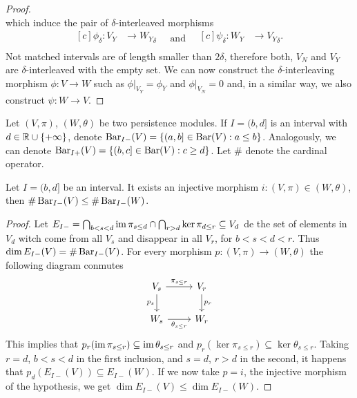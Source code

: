 \begin{proof}
\begin{equation*}
    \end{equation*}
    which induce the pair of $\delta$-interleaved morphisms
    \begin{equation*}
        \begin{aligned}[c]
        \phi_\delta: V_Y &\to {W_Y}_\delta\\
        \end{aligned}
        \quad \text{and} \quad
        \begin{aligned}[c]
        \psi_\delta: W_Y &\to {V_Y}_\delta.\\
        \end{aligned}
    \end{equation*}
    Not matched intervals are of length smaller than $ 2 \delta $, therefore both, $V_N$ and $V_Y$ are $\delta$-interleaved with the empty set. We can now construct the $\delta$-interleaving morphism $ \phi: V \to W$ such as $\phi \vert_{V_Y} = \phi_Y$ and $\phi \vert_{V_N} = 0$ and, in a similar way, we also construct $ \psi: W \to V$.
\end{proof}

Let $(V, \pi)$, $(W, \theta)$ be two persistence modules. If $ I = (b, d]$ is an interval with $ d \in \mathbb R \cup \{+ \infty\}$, denote $ \operatorname{Bar}_{I-}(V) = \left\{ (a, b] \in \operatorname{Bar}(V) : a \leq b\right\}$. Analogously, we can denote $ \operatorname{Bar}_{I+}(V) = \left\{ (b, c] \in \operatorname{Bar}(V) : c \geq d\right\}$. Let $ \# $ denote the cardinal operator.

\begin{lemma} %
    Let $ I = (b, d] $ be an interval. It exists an injective morphism $i: (V, \pi) \in (W, \theta) $, then $\# \operatorname{Bar}_{I-}(V) \leq \# \operatorname{Bar}_{I-}(W) $.
\end{lemma}
\begin{proof}
    Let $ E_{I-} = \bigcap_{b < s < d} \operatorname{im} \pi_{s\leq d} \cap \bigcap_{r> d} \ker \pi_{d \leq r} \subseteq V_d $ de the set of elements in $ V_d $ witch come from all $ V_s $ and disappear in all $ V_r $, for $ b < s < d < r $. Thus $ \dim E_{I-}(V) = \# \operatorname{Bar}_{I-}(V) $. For every morphism $ p: (V, \pi) \to (W, \theta) $ the following diagram conmutes
    $$
    \begin{tikzcd}
        V_s \arrow[r, "\pi_{s \leq r}"] \arrow[d, "p_s"'] & V_r \arrow[d, "p_r"] \\
        W_s \arrow[r, "\theta_{s \leq r}"']               & W_r
    \end{tikzcd}
    $$
    This implies that $ p_r(\operatorname{im} \pi_{s \leq r}) \subseteq \operatorname{im} \theta_{s \leq r} $ and $ p_r(\ker \pi_{s \leq r}) \subseteq \ker \theta_{s \leq r} $. Taking $ r = d $, $ b < s < d $ in the first inclusion, and $ s = d $, $ r > d $ in the second, it happens that $ p_d(E_{I-}(V)) \subseteq E_{I-}(W) $. If we now take $ p = i $, the injective morphism of the hypothesis, we get $ \dim E_{I-}(V) \leq \dim E_{I-}(W)$.
\end{proof}
 
